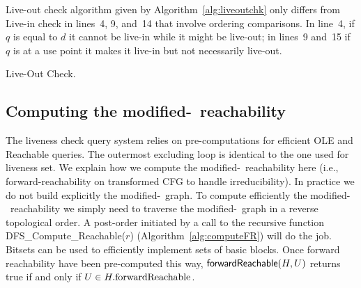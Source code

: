 Live-out check algorithm given by Algorithm~\ref{alg:liveoutchk} only differs from Live-in check in lines~4, 9, and~14 that involve ordering comparisons.
In line~4, if $q$ is equal to $d$ it cannot be live-in while it might be live-out; in lines~9 and~15 if $q$ is at a use point it makes it live-in but not necessarily live-out.

\begin{algorithm}
  \caption{Live-Out Check.}
  \label{alg:liveoutchk}
\end{algorithm}


\subsection{Computing the modified-\reduced\ reachability}

The liveness check query system relies on pre-computations for efficient \textsf{OLE} and \textsf{{\reduced}Reachable} queries.
The outermost excluding loop is identical to the one used for liveness set.
We explain how we compute the modified-\reduced\ reachability here (i.e., 
forward-reachability on transformed CFG to handle irreducibility).
In practice we do not build explicitly the modified-\reduced\ graph.
To compute efficiently the modified-\reduced\ reachability we simply need to traverse the modified-\reduced\ graph in a reverse topological order.
A post-order initiated by a call to the recursive function \textsf{DFS\_Compute\_{\reduced}Reachable}($r$) (Algorithm~\ref{alg:computeFR}) will do the job.
Bitsets can be used to efficiently implement sets of basic blocks.
Once forward reachability have been pre-computed this way, $\textsf{{forward}Reachable}(H,U)$ returns true if and only if $U\in H.\textrm{{forward}Reachable}$.

